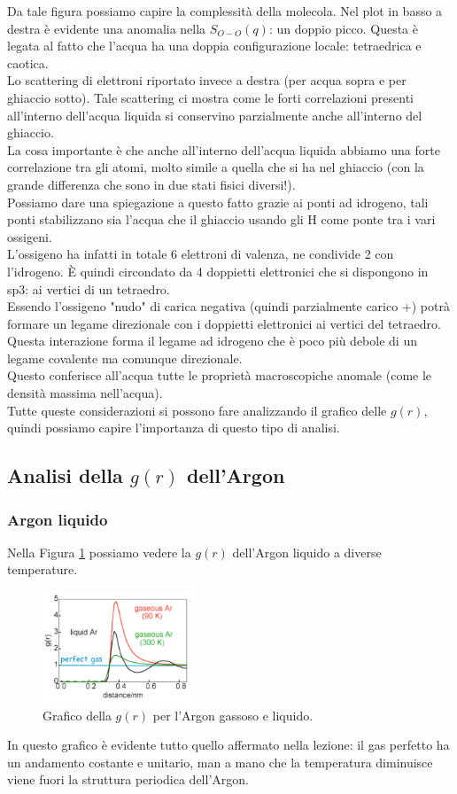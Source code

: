 Da tale figura possiamo capire la complessità della molecola. Nel plot in basso a destra è evidente una anomalia nella $S_{O-O}(q)$: un doppio picco. Questa è legata al fatto che l'acqua ha una doppia configurazione locale: tetraedrica e caotica.\\
Lo scattering di elettroni riportato invece a destra (per acqua sopra e per ghiaccio sotto). Tale scattering ci mostra come le forti correlazioni presenti all'interno dell'acqua liquida si conservino parzialmente anche all'interno del ghiaccio.\\
La cosa importante è che anche all'interno dell'acqua liquida abbiamo una forte correlazione tra gli atomi, molto simile a quella che si ha nel ghiaccio (con la grande differenza che sono in due stati fisici diversi!).\\
Possiamo dare una spiegazione a questo fatto grazie ai ponti ad idrogeno, tali ponti stabilizzano sia l'acqua che il ghiaccio usando gli H come ponte tra i vari ossigeni.\\
L'ossigeno ha infatti in totale 6 elettroni di valenza, ne condivide 2 con l'idrogeno. È quindi circondato da 4 doppietti elettronici che si dispongono in sp3: ai vertici di un tetraedro. \\
Essendo l'ossigeno "nudo" di carica negativa (quindi parzialmente carico +) potrà formare un legame direzionale con i doppietti elettronici ai vertici del tetraedro. Questa interazione forma il legame ad idrogeno che è poco più debole di un legame covalente ma comunque direzionale. \\
Questo conferisce all'acqua tutte le proprietà macroscopiche anomale (come le densità massima nell'acqua).\\
Tutte queste considerazioni si possono fare analizzando il grafico delle $g(r)$, quindi possiamo capire l'importanza di questo tipo di analisi.
\subsection{Analisi della $g(r)$ dell'Argon}
\label{subsec:Analisi della $g(r)$ dell'argon liquido}
\subsubsection{Argon liquido}
\label{subsubsec:Argon liquido}
Nella Figura \ref{fig:figures-argon-g-png} possiamo vedere la $g(r)$ dell'Argon liquido a diverse temperature.
\begin{figure}[ht]
	\centering
	\includegraphics[width=0.4\textwidth]{figures/argon-g.png}
	\caption{Grafico della $g(r)$ per l'Argon gassoso e liquido.}
	\label{fig:figures-argon-g-png}
\end{figure}
In questo grafico è evidente tutto quello affermato nella lezione: il gas perfetto ha un andamento costante e unitario, man a mano che la temperatura diminuisce viene fuori la struttura periodica dell'Argon.
